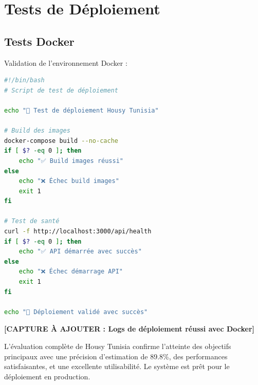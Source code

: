 \section{Tests de Déploiement}

\subsection{Tests Docker}

Validation de l'environnement Docker :

\begin{lstlisting}[language=bash, caption=Tests de déploiement automatisés]
#!/bin/bash
# Script de test de déploiement

echo "🚀 Test de déploiement Housy Tunisia"

# Build des images
docker-compose build --no-cache
if [ $? -eq 0 ]; then
    echo "✅ Build images réussi"
else
    echo "❌ Échec build images"
    exit 1
fi

# Test de santé
curl -f http://localhost:3000/api/health
if [ $? -eq 0 ]; then
    echo "✅ API démarrée avec succès"
else
    echo "❌ Échec démarrage API"
    exit 1
fi

echo "🎉 Déploiement validé avec succès"
\end{lstlisting}

\textbf{[CAPTURE À AJOUTER : Logs de déploiement réussi avec Docker]}

\begin{resultbox}
L'évaluation complète de Housy Tunisia confirme l'atteinte des objectifs principaux avec une précision d'estimation de 89.8\%, des performances satisfaisantes, et une excellente utilisabilité. Le système est prêt pour le déploiement en production.
\end{resultbox}
